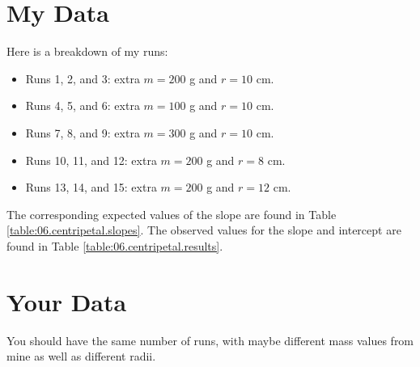 \section{My Data}
%
Here is a breakdown of my runs:
\begin{itemize}
    \item Runs 1, 2, and 3: extra $m = 200$ g and $r = 10$ cm.
    \item Runs 4, 5, and 6: extra $m = 100$ g and $r = 10$ cm.
    \item Runs 7, 8, and 9: extra $m = 300$ g and $r = 10$ cm.
    \item Runs 10, 11, and 12: extra $m = 200$ g and $r = 8$ cm.
    \item Runs 13, 14, and 15: extra $m = 200$ g and $r = 12$ cm.
\end{itemize}
The corresponding expected values of the slope are found in Table \ref{table:06.centripetal.slopes}. The observed values for the slope and intercept are found in Table \ref{table:06.centripetal.results}.
%
\section{Your Data}
%
You should have the same number of runs, with maybe different mass values from mine as well as different radii.
%
\newpage
